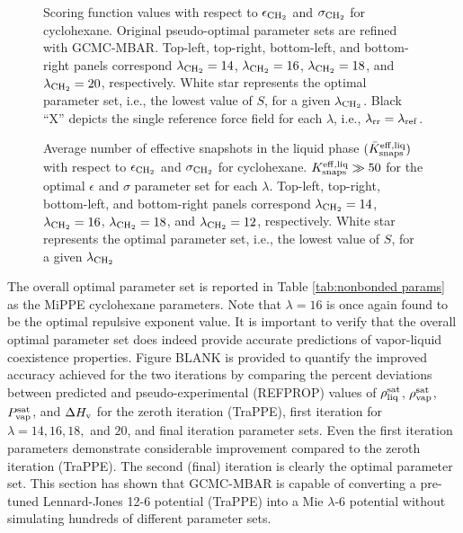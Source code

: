 \documentclass[journal=jced,manuscript=article]{achemso}
\begin{document}
	\begin{figure}[htb!]
	\centering
	\caption{Scoring function values with respect to $\epsilon_{\rm CH_2}$ and $\sigma_{\rm CH_2}$ for cyclohexane. Original pseudo-optimal parameter sets are refined with GCMC-MBAR. Top-left, top-right, bottom-left, and bottom-right panels correspond $\lambda_{\rm CH_2} = 14$, $\lambda_{\rm CH_2} = 16$, $\lambda_{\rm CH_2} = 18$, and $\lambda_{\rm CH_2} = 20$, respectively. White star represents the optimal parameter set, i.e., the lowest value of $S$, for a given $\lambda_{\rm CH_2}$. Black ``X'' depicts the single reference force field for each $\lambda$, i.e., $\lambda_{\rm rr} = \lambda_{\rm ref}$.} %
	\label{fig:Iterate_Score_CYC6}
\end{figure} 

\begin{figure}[htb!]
	\centering
	\caption{Average number of effective snapshots in the liquid phase $(\bar K_{\rm snaps}^{\rm eff, liq})$ with respect to $\epsilon_{\rm CH_2}$ and $\sigma_{\rm CH_2}$ for cyclohexane. $K_{\rm snaps}^{\rm eff, liq} \gg 50$ for the optimal $\epsilon$ and $\sigma$ parameter set for each $\lambda$. Top-left, top-right, bottom-left, and bottom-right panels correspond $\lambda_{\rm CH_2} = 14$, $\lambda_{\rm CH_2} = 16$, $\lambda_{\rm CH_2} = 18$, and $\lambda_{\rm CH_2} = 12$, respectively. White star represents the optimal parameter set, i.e., the lowest value of $S$, for a given $\lambda_{\rm CH_2}$}
	\label{fig:Iterate_Neff_CYC6}
\end{figure}

The overall optimal parameter set is reported in Table \ref{tab:nonbonded params} as the MiPPE cyclohexane parameters. Note that $\lambda = 16$ is once again found to be the optimal repulsive exponent value. It is important to verify that the overall optimal parameter set does indeed provide accurate predictions of vapor-liquid coexistence properties. Figure BLANK is provided to quantify the improved accuracy achieved for the two iterations by comparing the percent deviations between predicted and pseudo-experimental (REFPROP) values of $\rho_{\rm liq}^{\rm sat}$, $\rho_{\rm vap}^{\rm sat}$, $P_{\rm vap}^{\rm sat}$, and $\Delta H_{\rm v}$ for the zeroth iteration (TraPPE), first iteration for $\lambda = 14, 16, 18,$ and $20$, and final iteration parameter sets. Even the first iteration parameters demonstrate considerable improvement compared to the zeroth iteration (TraPPE). The second (final) iteration is clearly the optimal parameter set. This section has shown that GCMC-MBAR is capable of converting a pre-tuned Lennard-Jones 12-6 potential (TraPPE) into a Mie $\lambda$-6 potential without simulating hundreds of different parameter sets.
\end{document}

